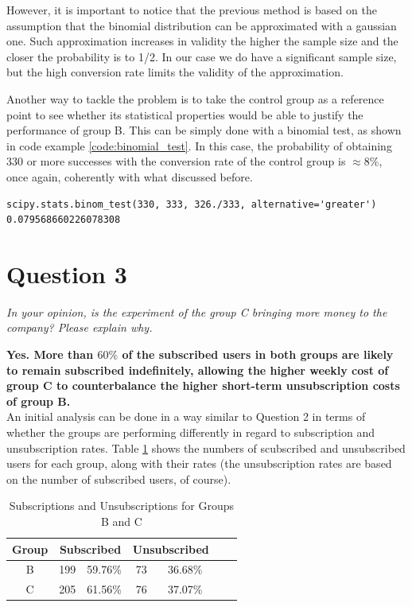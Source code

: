 \documentclass[paper=a4, fontsize=10pt]{report}
\begin{document}
However, it is important to notice that the previous method is based on the assumption that the binomial distribution can be approximated with a gaussian one.
Such approximation increases in validity the higher the sample size and the closer the probability is to 1/2. In our case we do have a significant sample size, but the 
high conversion rate limits the validity of the approximation.

Another way to tackle the problem is to take the control group as a reference point to see whether its statistical properties would be
able to justify the performance of group B. This can be simply done with a binomial test, as shown in code example \ref{code:binomial_test}. In this case, 
the probability
of obtaining 330 or more successes with the conversion rate of the control group is $\approx 8\%$, once again, coherently with what discussed before.

\footnotesize
\begin{lstlisting}[frame=single,caption= Binomial Test\label{code:binomial_test}]
scipy.stats.binom_test(330, 333, 326./333, alternative='greater')
0.079568660226078308
\end{lstlisting}
\normalsize



\section*{Question 3}

\textit{In your opinion, is the experiment of the group C bringing more money to the company? Please explain why.}

\textbf{Yes. More than $60\%$ of the subscribed users in both groups are likely to remain subscribed indefinitely, allowing
the higher weekly cost of group C to counterbalance the higher short-term unsubscription costs of group B.}\\


An initial analysis can be done in a way similar to Question 2 in terms of whether the groups are performing differently in regard to subscription and unsubscription rates.
Table \ref{tab:sub_unsub_rates} shows the numbers of scubscribed and unsubscribed users for each group, along with their rates (the unsubscription rates are based on the number of subscribed users, of course).

\begin{table}[htbp]
\normalsize

  \centering
  \caption{Subscriptions and Unsubscriptions for Groups B and C}
    \begin{tabular}{ccccccc}
    \toprule
    \textbf{Group } & \multicolumn{2}{c}{\textbf{Subscribed}} & \multicolumn{2}{c}{\textbf{Unsubscribed}} \\
    \midrule
    B & 199  & 59.76\% & 73  & 36.68\%  \\
    C & 205   & 61.56\% & 76   & 37.07\%  \\
    \bottomrule
    \end{tabular}%
  \label{tab:sub_unsub_rates}%
\end{table}%
\normalsize
\end{document}
